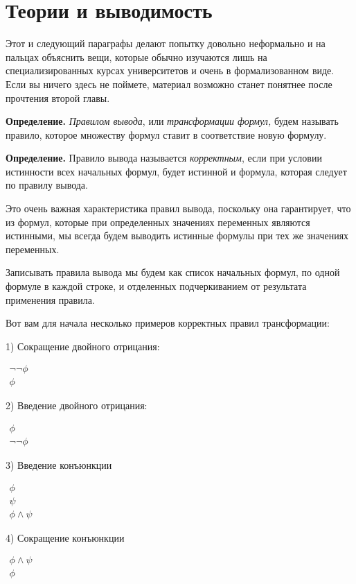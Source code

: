 \section{Теории и выводимость}

Этот и следующий параграфы делают попытку довольно неформально и на пальцах объяснить вещи, которые обычно изучаются лишь на специализированных курсах университетов и очень в формализованном виде. Если вы ничего здесь не поймете, материал возможно станет понятнее после прочтения второй главы.

{\bfseries Определение.} {\slshape Правилом вывода}, или {\slshape трансформации формул,} будем называть правило, которое  множеству формул ставит в соответствие новую формулу.

{\bfseries Определение.} Правило вывода называется {\slshape корректным}, если при условии истинности всех начальных формул, будет истинной и формула, которая следует по правилу вывода.

Это очень важная характеристика правил вывода, поскольку она гарантирует, что из формул, которые при определенных значениях переменных являются истинными, мы всегда будем выводить истинные формулы при тех же значениях переменных.

Записывать правила вывода мы будем как список начальных формул, по одной формуле в каждой строке, и отделенных подчеркиванием от результата применения правила.

Вот вам для начала несколько примеров корректных правил трансформации:

1) Сокращение двойного отрицания:

$\begin{array}{l} \neg\neg\phi\\ \hline \phi\end{array}$

2) Введение двойного отрицания:

$\begin{array}{l}\phi\\ \hline\neg\neg \phi\end{array}$

3) Введение конъюнкции

$\begin{array}{l}\phi \\ \psi\\ \hline \phi\wedge \psi\end{array}$

4) Сокращение конъюнкции

$\begin{array}{l}\phi \wedge \psi\\ \hline \phi\end{array}$

